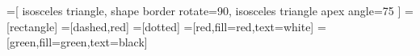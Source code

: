 \usepackage{tikz}
\usepackage{pgfplots}               %

\pgfplotsset{compat=1.18}          %
\usetikzlibrary{pgfplots.dateplot}  %

\usetikzlibrary{shapes}
\usetikzlibrary{graphs}            %
\usetikzlibrary{quotes}            %
\usetikzlibrary{positioning}       %

\tikzset{>=stealth}

=[
  isosceles triangle,
  shape border rotate=90,
  isosceles triangle apex angle=75
]
=[rectangle] %
=[dashed,red]
=[dotted] %
=[red,fill=red,text=white]
=[green,fill=green,text=black]
